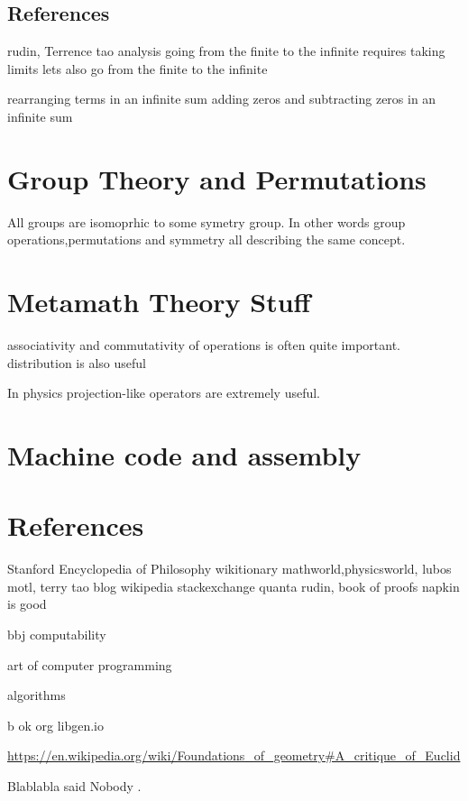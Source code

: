 \documentclass{book}
\begin{document}
\section{References}
rudin, Terrence tao analysis
going from the finite to the infinite requires taking limits
lets also go from the finite to the infinite

rearranging terms in an infinite sum
adding zeros and subtracting zeros in an infinite sum

\chapter{Group Theory and Permutations}
All groups are isomoprhic to some symetry group. In other words
group operations,permutations and symmetry all describing the same concept. 

\chapter{Metamath Theory Stuff}
associativity and commutativity of operations is often quite important. 
distribution is also useful

In physics projection-like operators are extremely useful. 




\chapter{Machine code and assembly}
\backmatter


\chapter{References}
Stanford Encyclopedia of Philosophy
wikitionary
mathworld,physicsworld, lubos motl, terry tao blog
wikipedia
stackexchange
quanta
rudin,
book of proofs
napkin is good

bbj computability

art of computer programming

algorithms

b ok org
libgen.io



\url{https://en.wikipedia.org/wiki/Foundations_of_geometry#A_critique_of_Euclid}


Blablabla said Nobody  \autocite{DUMMY:1}.


\newpage

\printbibliography
\end{document}
